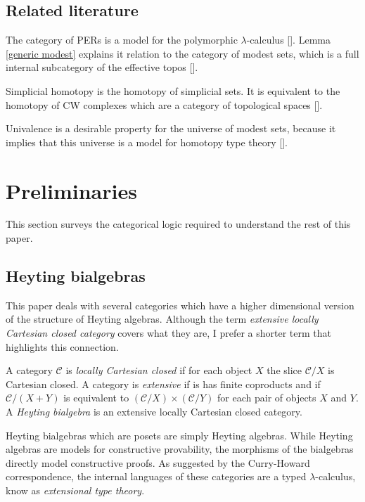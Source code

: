 \documentclass{tac}
\newcommand\cat\mathcal
\newcommand\citep[1]{[\cite{#1}]}
\begin{document}
\subsection{Related literature}
The category of PERs is a model for the polymorphic $\lambda$-calculus \citep{MR1099188,MR2074932,MR1003196}. Lemma \ref{generic modest} explains it relation to the category of modest sets, which is a full internal subcategory of the effective topos \citep{MR1097022,MR1023803,MR2479466}.

Simplicial homotopy is the homotopy of simplicial sets. It is equivalent to the homotopy of CW complexes which are a category of topological spaces \citep{Hovey99,GJSHT}.

Univalence is a desirable property for the universe of modest sets, because it implies that this universe is a model for homotopy type theory \citep{hottbook,KLV12}.

\section{Preliminaries}
This section surveys the categorical logic required to understand the rest of this paper.

\subsection{Heyting bialgebras}
This paper deals with several categories which have a higher dimensional version of the structure of Heyting algebras. Although the term \emph{extensive locally Cartesian closed category} covers what they are, I prefer a shorter term that highlights this connection.

\begin{definition} A category $\cat C$ is \emph{locally Cartesian closed} if for each object $X$ the slice $\cat C/X$ is Cartesian closed. A category is \emph{extensive} if is has finite coproducts and if $\cat C/(X+Y)$ is equivalent to $(\cat C/X)\times(\cat C/Y)$ for each pair of objects $X$ and $Y$. A \emph{Heyting bialgebra} is an extensive locally Cartesian closed category. \label{Heyting bialgebra}
\end{definition}

Heyting bialgebras which are posets are simply Heyting algebras. While Heyting algebras are models for constructive provability, the morphisms of the bialgebras directly model constructive proofs. As suggested by the Curry-Howard correspondence, the internal languages of these categories are a typed $\lambda$-calculus, know as \emph{extensional type theory}.
\end{document}
